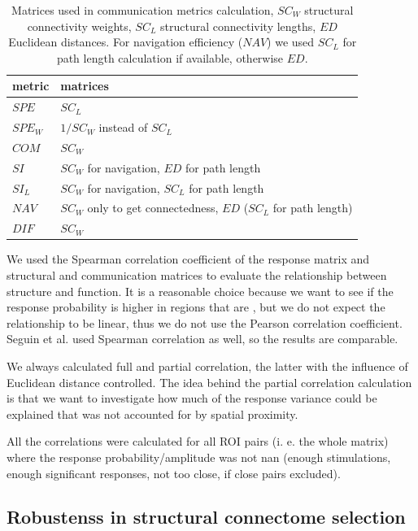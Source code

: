 \begin{table}
    \centering
    \begin{tabular}{l| l}
        metric & matrices  \\
        \hline
        $SPE$   & $SC_L$ \\
        $SPE_W$ & $1/SC_W$ instead of $SC_L$ \\
        $COM$   & $SC_W$ \\
        $SI$    & $SC_W$ for navigation, $ED$ for path length \\
        $SI_L$  & $SC_W$ for navigation, $SC_L$ for path length \\
        $NAV$   & $SC_W$ only to get connectedness, $ED$ ($SC_L$ for path length) \\ 
        $DIF$   & $SC_W$ \\
    \end{tabular}
    \caption[Matrices used in communication metrics calculation]{Matrices used in communication metrics calculation, $SC_W$ structural connectivity weights, $SC_L$ structural connectivity lengths, $ED$ Euclidean distances. For navigation efficiency ($NAV$) we used $SC_L$ for path length calculation if available, otherwise $ED$.}
    \label{tab:matrices_usage}
\end{table}

We used the Spearman correlation coefficient of the response matrix and structural and communication matrices to evaluate the relationship between structure and function. It is a reasonable choice because we want to see if the response probability is higher in regions that are , but we do not expect the relationship to be linear, thus we do not use the Pearson correlation coefficient. Seguin et al. used Spearman correlation as well, so the results are comparable.

We always calculated full and partial correlation, the latter with the influence of Euclidean distance controlled. The idea behind the partial correlation calculation is that we want to investigate how much of the response variance could be explained that was not accounted for by spatial proximity.

All the correlations were calculated for all ROI pairs (i. e. the whole matrix) where the response probability/amplitude was not nan (enough stimulations, enough significant responses, not too close, if close pairs excluded).

\subsection{Robustenss in structural connectome selection}\label{sec:sc-robustness_ftract}

